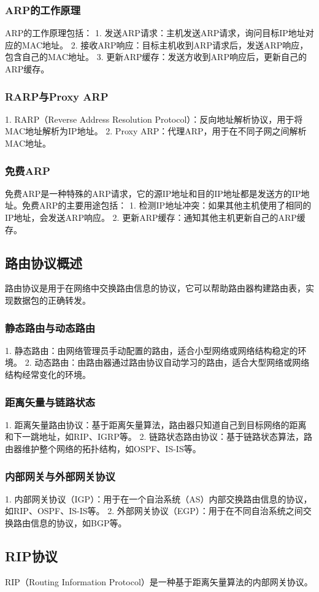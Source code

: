 \documentclass{book}
\begin{document}
\subsubsection{ARP的工作原理}
ARP的工作原理包括：
1. 发送ARP请求：主机发送ARP请求，询问目标IP地址对应的MAC地址。
2. 接收ARP响应：目标主机收到ARP请求后，发送ARP响应，包含自己的MAC地址。
3. 更新ARP缓存：发送方收到ARP响应后，更新自己的ARP缓存。
\subsubsection{RARP与Proxy ARP}
1. RARP（Reverse Address Resolution Protocol）：反向地址解析协议，用于将MAC地址解析为IP地址。
2. Proxy ARP：代理ARP，用于在不同子网之间解析MAC地址。
\subsubsection{免费ARP}
免费ARP是一种特殊的ARP请求，它的源IP地址和目的IP地址都是发送方的IP地址。免费ARP的主要用途包括：
1. 检测IP地址冲突：如果其他主机使用了相同的IP地址，会发送ARP响应。
2. 更新ARP缓存：通知其他主机更新自己的ARP缓存。
\subsection{路由协议概述}
路由协议是用于在网络中交换路由信息的协议，它可以帮助路由器构建路由表，实现数据包的正确转发。
\subsubsection{静态路由与动态路由}
1. 静态路由：由网络管理员手动配置的路由，适合小型网络或网络结构稳定的环境。
2. 动态路由：由路由器通过路由协议自动学习的路由，适合大型网络或网络结构经常变化的环境。
\subsubsection{距离矢量与链路状态}
1. 距离矢量路由协议：基于距离矢量算法，路由器只知道自己到目标网络的距离和下一跳地址，如RIP、IGRP等。
2. 链路状态路由协议：基于链路状态算法，路由器维护整个网络的拓扑结构，如OSPF、IS-IS等。
\subsubsection{内部网关与外部网关协议}
1. 内部网关协议（IGP）：用于在一个自治系统（AS）内部交换路由信息的协议，如RIP、OSPF、IS-IS等。
2. 外部网关协议（EGP）：用于在不同自治系统之间交换路由信息的协议，如BGP等。
\subsection{RIP协议}
RIP（Routing Information Protocol）是一种基于距离矢量算法的内部网关协议。
\end{document}
